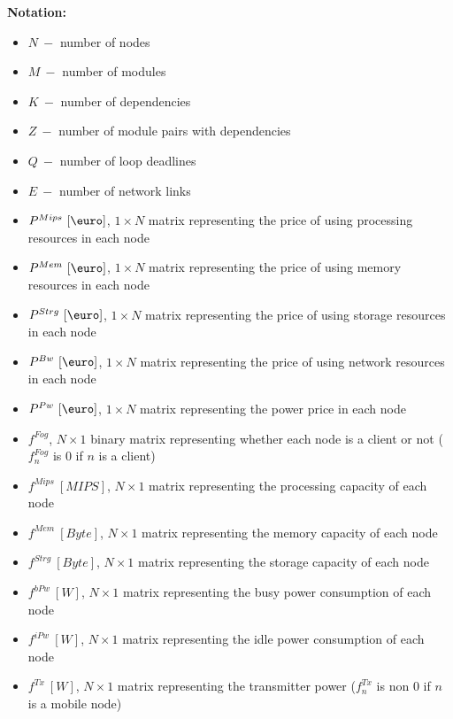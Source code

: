 \documentclass{article}
\begin{document}
\newcommand{\SubItem}[1]{
    {\setlength\itemindent{15pt} \item[-] #1}
}

\noindent\textbf{Notation:}
\begin{itemize}
	\item $N~-$ number of nodes
	\item $M~-$ number of modules
	\item $K~-$ number of dependencies
	\item $Z~-$ number of module pairs with dependencies
	\item $Q~-$ number of loop deadlines
	\item $E~-$ number of network links\\
	
	\item $P^{Mips}~[\mbox{\euro}]$, $1\times N$ matrix representing the price of using processing resources in each node
	\item $P^{Mem}~[\mbox{\euro}]$, $1\times N$ matrix representing the price of using memory resources in each node
	\item $P^{Strg}~[\mbox{\euro}]$, $1\times N$ matrix representing the price of using storage resources in each node
	\item $P^{Bw}~[\mbox{\euro}]$, $1\times N$ matrix representing the price of using network resources in each node
	\item $P^{Pw}~[\mbox{\euro}]$, $1\times N$ matrix representing the power price in each node\\
	
	\item $f^{Fog}$, $N\times 1$ binary matrix representing whether each node is a client or not ($f^{Fog}_n$ is 0 if $n$ is a client)
	\item $f^{Mips}~[MIPS]$, $N\times 1$ matrix representing the processing capacity of each node
	\item $f^{Mem}~[Byte]$, $N\times 1$ matrix representing the memory capacity of each node
	\item $f^{Strg}~[Byte]$, $N\times 1$ matrix representing the storage capacity of each node
	\item $f^{bPw}~[W]$, $N\times 1$ matrix representing the busy power consumption of each node
	\item $f^{iPw}~[W]$, $N\times 1$ matrix representing the idle power consumption of each node
	\item $f^{Tx}~[W]$, $N\times 1$ matrix representing the transmitter power ($f^{Tx}_n$ is non 0 if $n$ is a mobile node)\\
	

\end{itemize}
\end{document}
